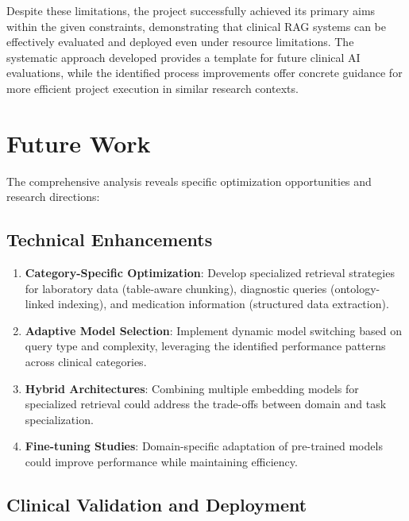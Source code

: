 Despite these limitations, the project successfully achieved its primary aims within the given constraints, demonstrating that clinical RAG systems can be effectively evaluated and deployed even under resource limitations. The systematic approach developed provides a template for future clinical AI evaluations, while the identified process improvements offer concrete guidance for more efficient project execution in similar research contexts.
\newpage
\section{Future Work}

The comprehensive analysis reveals specific optimization opportunities and research directions:

\subsection{Technical Enhancements}

\begin{enumerate}
    \item \textbf{Category-Specific Optimization}: Develop specialized retrieval strategies for laboratory data (table-aware chunking), diagnostic queries (ontology-linked indexing), and medication information (structured data extraction).

    \item \textbf{Adaptive Model Selection}: Implement dynamic model switching based on query type and complexity, leveraging the identified performance patterns across clinical categories.

    \item \textbf{Hybrid Architectures}: Combining multiple embedding models for specialized retrieval could address the trade-offs between domain and task specialization.

    \item \textbf{Fine-tuning Studies}: Domain-specific adaptation of pre-trained models could improve performance while maintaining efficiency.
\end{enumerate}

\subsection{Clinical Validation and Deployment}


